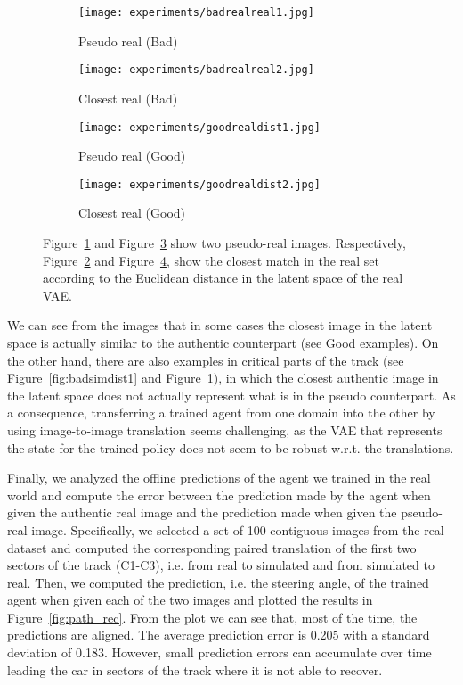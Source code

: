 \begin{figure}[h]
  \centering
  \begin{subfigure}{.24\linewidth}
	      \centering
	      \texttt{[image: experiments/badrealreal1.jpg]}
	      \caption{Pseudo real (Bad)}\label{fig:badrealdist1}
	  \end{subfigure}%
  \hfill
  \begin{subfigure}{.24\linewidth}
	    \centering
	    \texttt{[image: experiments/badrealreal2.jpg]}
	    \caption{Closest real (Bad)}\label{fig:badrealdist2}
	  \end{subfigure}%
  \hfill
  \begin{subfigure}{.24\linewidth}
	      \centering
	      \texttt{[image: experiments/goodrealdist1.jpg]}
	      \caption{Pseudo real (Good)}\label{fig:goodrealdist1}
	  \end{subfigure}%
  \hfill
  \begin{subfigure}{.24\linewidth}
	    \centering
	    \texttt{[image: experiments/goodrealdist2.jpg]}
	    \caption{Closest real (Good)}\label{fig:goodrealdist2}
	\end{subfigure}
	  \caption{Figure~\ref{fig:badrealdist1} and Figure~\ref{fig:goodrealdist1} show two pseudo-real images. Respectively, Figure~\ref{fig:badrealdist2} and Figure~\ref{fig:goodrealdist2}, show the closest match in the real set according to the Euclidean distance in the latent space of the real VAE.}
	  \label{fig:realdistance}
\end{figure}

We can see from the images that in some cases the closest image in the latent space is actually similar to the authentic counterpart (see Good examples). On the other hand, there are also examples in critical parts of the track (see Figure~\ref{fig:badsimdist1} and Figure~\ref{fig:badrealdist1}), in which the closest authentic image in the latent space does not actually represent what is in the pseudo counterpart. As a consequence, transferring a trained agent from one domain into the other by using image-to-image translation seems challenging, as the VAE that represents the state for the trained policy does not seem to be robust w.r.t. the translations.

Finally, we analyzed the offline predictions of the agent we trained in the real world and compute the error between the prediction made by the agent when given the authentic real image and the prediction made when given the pseudo-real image. Specifically, we selected a set of 100 contiguous images from the real dataset and computed the corresponding paired translation of the first two sectors of the track (C1-C3), i.e. from real to simulated and from simulated to real. Then, we computed the prediction, i.e. the steering angle, of the trained agent when given each of the two images and plotted the results in Figure~\ref{fig:path_rec}. From the plot we can see that, most of the time, the predictions are aligned. The average prediction error is 0.205 with a standard deviation of 0.183. However, small prediction errors can accumulate over time leading the car in sectors of the track where it is not able to recover.

